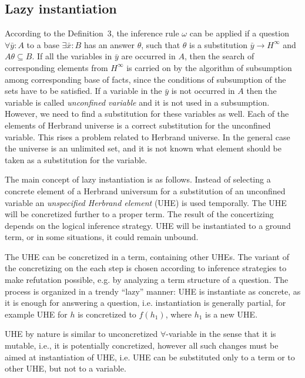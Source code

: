 \documentclass[runningheads,a4paper]{llncs}
\begin{document}
\subsection{Lazy instantiation}

According to the Definition~3, the inference rule $\omega$ can be applied if a question $\forall \bar{y}\colon A$ to a base $\exists \bar{x}\colon B$ has an answer $\theta$, such that $\theta$ is a substitution $\bar{y} \rightarrow H^{\infty}$ and $A\theta \subseteq B$. If all the variables in $\bar{y}$ are occurred in $A$, then the search of corresponding elements from $H^{\infty}$ is carried on by the algorithm of subsumption among corresponding base of facts, since the conditions of subsumption of the sets have to be satisfied. If a variable in the $\bar{y}$ is not occurred in $A$ then the variable is called \emph{unconfined variable} and it is not used in a subsumption. However, we need to find a substitution for these variables as well.  Each of the elements of Herbrand universe is a correct substitution for the unconfined variable. This rises a problem related to Herbrand universe. In the general case the universe is an unlimited set, and it is not known what element should be taken as a substitution for the variable.

The main concept of lazy instantiation is as follows. Instead of selecting a concrete element of a Herbrand universum for a substitution of an unconfined variable an {\em unspecified Herbrand element} (UHE) is used temporally. The UHE will be concretized further to a proper term. The result of the concertizing depends on the logical inference strategy. UHE will be instantiated to a ground term, or in some situations, it could remain unbound.

The UHE can be concretized in a term, containing other UHEs. The variant of the concretizing on the each step is chosen according to inference strategies to make refutation possible, e.g. by analyzing a term structure of a question.  The process is organized in a trendy ``lazy'' manner: UHE is instantiate as concrete, as it is enough for answering a question, i.e. instantiation is generally partial, for example UHE for $h$ is concretized to $f(h_1)$, where $h_1$ is a new UHE.

UHE by nature is similar to unconcretized $\forall$-variable in the sense that it is mutable, i.e., it is potentially concretized, however all such changes must be aimed at instantiation of  UHE, i.e. UHE can be substituted only to a term or to other UHE, but not to a variable.
\end{document}
